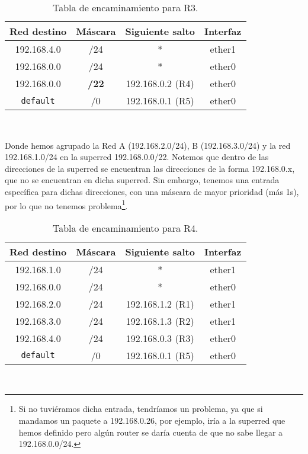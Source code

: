 \begin{ejercicio}
    \begin{table}
        \centering
        \begin{tabular}{|c|c|c|c|}
            \hline
            Red destino & Máscara & Siguiente salto & Interfaz \\
            \hline
            192.168.4.0 & /24 & * & ether1 \\
            \hline
            192.168.0.0 & /24 & * & ether0 \\
            \hline
            192.168.0.0 & \textbf{/22} & 192.168.0.2 (R4) & ether0 \\
            \hline
            \verb|default| & /0 & 192.168.0.1 (R5) & ether0 \\
            \hline
        \end{tabular}\\
        \caption{Tabla de encaminamiento para R3.}
    \end{table}
    Donde hemos agrupado la Red A (192.168.2.0/24), B (192.168.3.0/24) y la red 192.168.1.0/24 en la superred 192.168.0.0/22.
    Notemos que dentro de las direcciones de la superred se encuentran las direcciones de la forma 192.168.0.x, que no se encuentran en dicha superred. Sin embargo, tenemos una entrada específica para dichas direcciones, con una máscara de mayor prioridad (más 1s), por lo que no tenemos problema\footnote{Si no tuviéramos dicha entrada, tendríamos un problema, ya que si mandamos un paquete a 192.168.0.26, por ejemplo, iría a la superred que hemos definido pero algún router se daría cuenta de que no sabe llegar a 192.168.0.0/24.}.

    \begin{table}
        \centering
        \begin{tabular}{|c|c|c|c|}
            \hline
            Red destino & Máscara & Siguiente salto & Interfaz \\
            \hline
            192.168.1.0 & /24 & * & ether1 \\
            \hline
            192.168.0.0 & /24 & * & ether0 \\
            \hline
            192.168.2.0 & /24 & 192.168.1.2 (R1) & ether1 \\
            \hline
            192.168.3.0 & /24 & 192.168.1.3 (R2) & ether1 \\
            \hline
            192.168.4.0 & /24 & 192.168.0.3 (R3) & ether0 \\
            \hline
            \verb|default| & /0 & 192.168.0.1 (R5) & ether0 \\
            \hline
        \end{tabular}\\
        \caption{Tabla de encaminamiento para R4.}
    \end{table}


\end{ejercicio}
